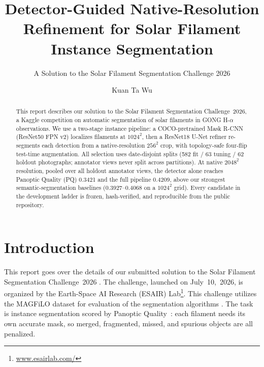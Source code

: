 \documentclass[sigconf]{acmart}
\begin{document}
\title{Detector-Guided Native-Resolution Refinement for Solar Filament Instance Segmentation}
\subtitle{A Solution to the Solar Filament Segmentation Challenge 2026} %


\author{Kuan Ta Wu}


\begin{abstract}
    This report describes our solution to the Solar Filament Segmentation Challenge~2026, a Kaggle competition on automatic segmentation of solar filaments in GONG H-$\alpha$ observations. We use a two-stage instance pipeline: a COCO-pretrained Mask R-CNN (ResNet50 FPN v2) localizes filaments at $1024^2$, then a ResNet18 U-Net refiner re-segments each detection from a native-resolution $256^2$ crop, with topology-safe four-flip test-time augmentation. All selection uses date-disjoint splits (582 fit / 63 tuning / 62 holdout photographs; annotator views never split across partitions). At native $2048^2$ resolution, pooled over all holdout annotator views, the detector alone reaches Panoptic Quality (PQ) 0.3421 and the full pipeline 0.4209, above our strongest semantic-segmentation baselines (0.3927--0.4068 on a $1024^2$ grid). Every candidate in the development ladder is frozen, hash-verified, and reproducible from the public repository.
\end{abstract}

\maketitle

\section{Introduction}
    This report goes over the details of our submitted solution to the Solar Filament Segmentation Challenge~2026 \cite{filament-segmentation-2026}. The challenge, launched on July~10,~2026, is organized by the Earth-Space AI Research (ESAIR) Lab\footnote{\href{https://www.esairlab.com/home}{www.esairlab.com/}}. This challenge utilizes the MAGFiLO dataset for evaluation of the segmentation algorithms \cite{ahmadzadeh2024dataset}. The task is instance segmentation scored by Panoptic Quality~\cite{kirillov2019panoptic}: each filament needs its own accurate mask, so merged, fragmented, missed, and spurious objects are all penalized.
\end{document}
